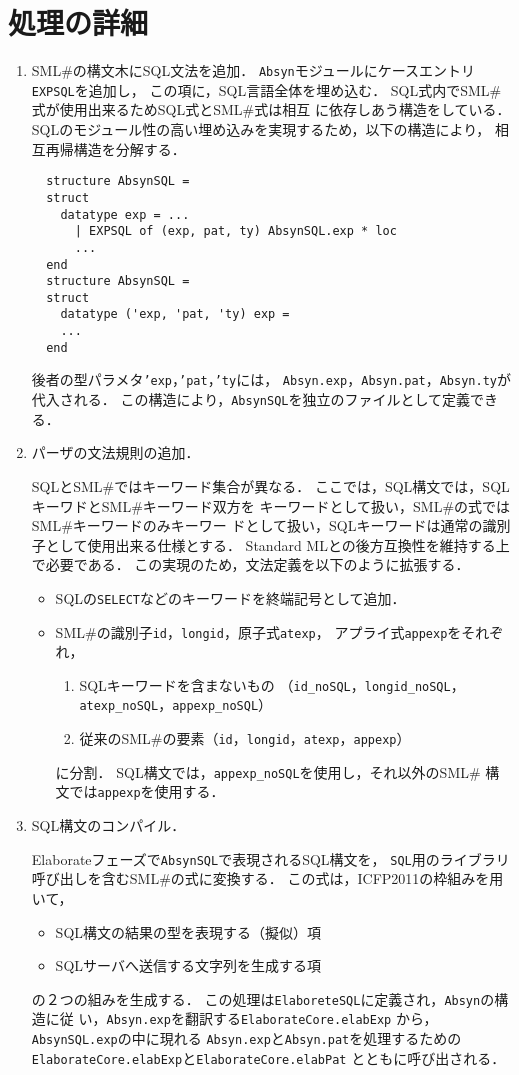 \documentclass{jbook}
\newcommand{\smlsharp}{SML\#}
\newcommand{\code}[1]{\mbox{\large\tt #1}}
\begin{document}
\section{処理の詳細}
\begin{enumerate}
\item \smlsharp{}の構文木にSQL文法を追加．
	\code{Absyn}モジュールにケースエントリ\code{EXPSQL}を追加し，
この項に，SQL言語全体を埋め込む．
	SQL式内で\smlsharp{}式が使用出来るためSQL式と\smlsharp{}式は相互
に依存しあう構造をしている．
	SQLのモジュール性の高い埋め込みを実現するため，以下の構造により，
相互再帰構造を分解する．
\begin{verbatim}
  structure AbsynSQL = 
  struct
    datatype exp = ...
      | EXPSQL of (exp, pat, ty) AbsynSQL.exp * loc
      ...
  end
  structure AbsynSQL =
  struct
    datatype ('exp, 'pat, 'ty) exp =
    ...
  end
\end{verbatim}
	後者の型パラメタ\code{'exp}，\code{'pat}，\code{'ty}には，
\code{Absyn.exp}，\code{Absyn.pat}，\code{Absyn.ty}が代入される．
	この構造により，\code{AbsynSQL}を独立のファイルとして定義できる．
\item パーザの文法規則の追加．

	SQLと\smlsharp{}ではキーワード集合が異なる．
	ここでは，SQL構文では，SQLキーワドと\smlsharp{}キーワード双方を
キーワードとして扱い，\smlsharp{}の式では\smlsharp{}キーワードのみキーワー
ドとして扱い，SQLキーワードは通常の識別子として使用出来る仕様とする．
	Standard MLとの後方互換性を維持する上で必要である．
	この実現のため，文法定義を以下のように拡張する．
\begin{itemize}
\item SQLの{\tt SELECT}などのキーワードを終端記号として追加．
\item \smlsharp{}の識別子\code{id}，\code{longid}，原子式\code{atexp}，
アプライ式\code{appexp}をそれぞれ，
\begin{enumerate}
\item SQLキーワードを含まないもの
（\code{id\_noSQL}，\code{longid\_noSQL}，\code{atexp\_noSQL}，\code{appexp\_noSQL}）
\item 従来の\smlsharp{}の要素（\code{id}，\code{longid}，\code{atexp}，\code{appexp}）
\end{enumerate}
に分割．
	SQL構文では，{\tt appexp\_noSQL}を使用し，それ以外の\smlsharp{}
構文では{\tt appexp}を使用する．
\end{itemize}
\item SQL構文のコンパイル．

	Elaborateフェーズで\code{AbsynSQL}で表現されるSQL構文を，
\code{SQL}用のライブラリ呼び出しを含む\smlsharp{}の式に変換する．
	この式は，ICFP2011の枠組みを用いて，
\begin{itemize}
\item SQL構文の結果の型を表現する（擬似）項
\item SQLサーバへ送信する文字列を生成する項
\end{itemize}
の２つの組みを生成する．
	この処理は\code{ElaboreteSQL}に定義され，\code{Absyn}の構造に従
い，\code{Absyn.exp}を翻訳する\code{ElaborateCore.elabExp}
から，\code{AbsynSQL.exp}の中に現れる
\code{Absyn.exp}と\code{Absyn.pat}を処理するための
\code{ElaborateCore.elabExp}と\code{ElaborateCore.elabPat}
とともに呼び出される．


\end{enumerate}
\end{document}
